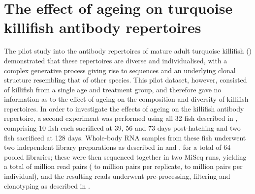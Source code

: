 \section{The effect of ageing on turquoise killifish antibody repertoires}
\label{sec:igseq_ageing}


The pilot study into the antibody repertoires of mature adult turquoise killifish () demonstrated that these repertoires are diverse and individualised, with a complex generative process giving rise to \naive sequences and an underlying clonal structure resembling that of other species. This pilot dataset, however, consisted of killifish from a single age and treatment group, and therefore gave no information as to the effect of ageing on the composition and diversity of killifish repertoires. In order to investigate the effects of ageing on the killifish antibody repertoire, a second \igseq experiment was performed using all 32 fish described in  , comprising 10 fish each sacrificed at 39, 56 and 73 days post-hatching and two fish sacrificed at 128 days. Whole-body RNA samples from these fish underwent two independent library preparations as described in  and , for a total of 64 pooled libraries; these were then sequenced together in two MiSeq runs, yielding a total of  million read pairs ( to  million pairs per replicate,  to  million pairs per individual), and the resulting reads underwent pre-processing, filtering and clonotyping as described in .

